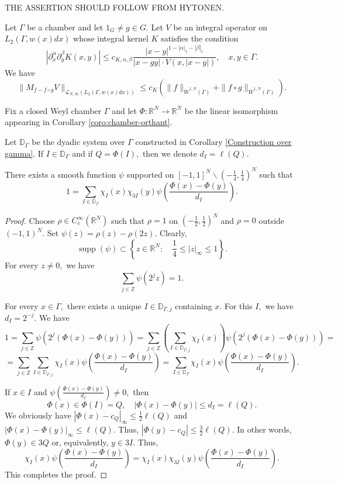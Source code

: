 \documentclass{amsart}
\numberwithin{equation}{section}
\begin{document}
{\color{red} THE ASSERTION SHOULD FOLLOW FROM HYTONEN.}

\begin{theorem} Let $\Gamma$ be a chamber and let $1_G\neq g\in G.$ Let $V$ be an integral operator on $L_2(\Gamma,w(x)dx)$ whose integral kernel $K$ satisfies the condition
$$|\partial_x^{\alpha}\partial_y^{\beta}K(x,y)|\leq c_{K,\alpha,\beta}\frac{|x-y|^{1-|\alpha|_1-|\beta|_1}}{|x-gy|\cdot V(x,|x-y|)},\quad x,y\in\Gamma.$$
We have
$$\|M_{f-f\circ g}V\|_{\mathcal{L}_{N,\infty}(L_2(\Gamma,w(x)dx))}\leq c_K(\|f\|_{\dot{W}^{1,N}(\Gamma)}+\|f\circ g\|_{\dot{W}^{1,N}(\Gamma)}).$$
\end{theorem}


\begin{nota}
Fix a closed Weyl chamber $\Gamma$ and let $\Phi:\mathbb{R}^N\to\mathbb{R}^N$ be the linear isomorphism appearing in Corollary \ref{coro:chamber-orthant}.

Let $\mathbb{D}_{\Gamma}$ be the dyadic system over $\Gamma$ constructed in
Corollary \ref{Construction over gamma}. If $I\in\mathbb{D}_{\Gamma}$ and if $Q=\Phi(I),$ then we denote $d_I=\ell(Q).$
\end{nota}

\begin{lemma} There exists a smooth function $\psi$ supported on $[-1,1]^N\backslash(-\frac14,\frac14)^N$ such that
$$1=\sum_{I\in\mathbb{D}_{\Gamma}}\chi_I(x)\chi_{3I}(y)\psi(\frac{\Phi(x)-\Phi(y)}{d_I}).$$
\end{lemma}
\begin{proof} Choose $\rho\in C_c^{\infty}(\mathbb{R}^N)$ such that $\rho=1$ on $(-\frac12,\frac12)^N$ and $\rho=0$ outside $(-1,1)^N.$ Set $\psi(z)=\rho(z)-\rho(2z).$ Clearly,
\begin{equation}\label{eq:rankone-psi-support}
\operatorname{supp}(\psi)\subset
\left\{z\in\mathbb{R}^N:\quad 
\frac14\leq |z|_{\infty}\leq 1\right\}.
\end{equation}
For every $z\neq0,$ we have
\begin{equation}\label{eq:rankone-psi-partition}
\sum_{j\in\mathbb{Z}}\psi(2^jz)=1.
\end{equation}

For every $x\in\Gamma,$ there exists a unique $I\in\mathbb{D}_{\Gamma,j}$ containing $x.$ For this $I,$ we have $d_I=2^{-j}.$ We have
$$1=\sum_{j\in\mathbb{Z}}\psi(2^j(\Phi(x)-\Phi(y)))=\sum_{j\in\mathbb{Z}}(\sum_{I\in\mathbb{D}_{\Gamma,j}}\chi_I(x))\psi(2^j(\Phi(x)-\Phi(y)))=$$
$$=\sum_{j\in\mathbb{Z}}\sum_{I\in\mathbb{D}_{\Gamma,j}}\chi_I(x)\psi(\frac{\Phi(x)-\Phi(y)}{d_I})=\sum_{I\in\mathbb{D}_{\Gamma}}\chi_I(x)\psi(\frac{\Phi(x)-\Phi(y)}{d_I}).$$

If $x\in I$ and $\psi(\frac{\Phi(x)-\Phi(y)}{d_I})\neq 0,$ then
$$\Phi(x)\in\Phi(I)=Q,\quad |\Phi(x)-\Phi(y)|\leq d_I=\ell(Q).$$
We obviously have $|\Phi(x)-c_Q|_{\infty}\leq\frac12\ell(Q)$ and $|\Phi(x)-\Phi(y)|_{\infty}\leq\ell(Q).$ Thus, $|\Phi(y)-c_Q|\leq\frac32\ell(Q).$ In other words, $\Phi(y)\in 3Q$ or, equivalently, $y\in 3I.$ Thus,
$$\chi_I(x)\psi(\frac{\Phi(x)-\Phi(y)}{d_I})=\chi_I(x)\chi_{3I}(y)\psi(\frac{\Phi(x)-\Phi(y)}{d_I}).$$
This completes the proof.
\end{proof}
\end{document}
